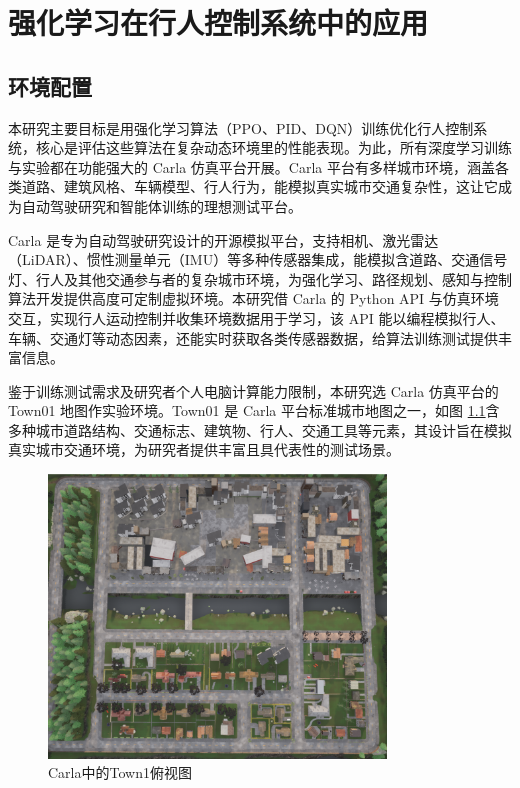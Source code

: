 \chapter{强化学习在行人控制系统中的应用}

\section{环境配置}

本研究主要目标是用强化学习算法（PPO、PID、DQN）训练优化行人控制系统，核心是评估这些算法在复杂动态环境里的性能表现。为此，所有深度学习训练与实验都在功能强大的 Carla 仿真平台开展。Carla 平台有多样城市环境，涵盖各类道路、建筑风格、车辆模型、行人行为，能模拟真实城市交通复杂性，这让它成为自动驾驶研究和智能体训练的理想测试平台。​

Carla 是专为自动驾驶研究设计的开源模拟平台，支持相机、激光雷达（LiDAR）、惯性测量单元（IMU）等多种传感器集成，能模拟含道路、交通信号灯、行人及其他交通参与者的复杂城市环境，为强化学习、路径规划、感知与控制算法开发提供高度可定制虚拟环境。本研究借 Carla 的 Python API 与仿真环境交互，实现行人运动控制并收集环境数据用于学习，该 API 能以编程模拟行人、车辆、交通灯等动态因素，还能实时获取各类传感器数据，给算法训练测试提供丰富信息。​

鉴于训练测试需求及研究者个人电脑计算能力限制，本研究选 Carla 仿真平台的 Town01 地图作实验环境。Town01 是 Carla 平台标准城市地图之一，如图 \ref{fig:town1}含多种城市道路结构、交通标志、建筑物、行人、交通工具等元素，其设计旨在模拟真实城市交通环境，为研究者提供丰富且具代表性的测试场景。

\begin{figure}[H]
    \centering
    \includegraphics[width=0.8\textwidth]{images/town1.pdf}
    \caption{Carla中的Town1俯视图}
    \label{fig:town1}
\end{figure}

